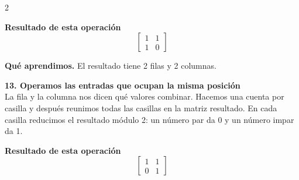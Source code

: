\documentclass[11pt,a4paper,landscape]{article}
\begin{document}
\begin{multicols*}{2}
\begin{minipage}{\linewidth}
\par{}\par\smallskip
\par\smallskip \textbf{Resultado de esta operación}\[\begin{bmatrix}1 & 1\\1 & 0\end{bmatrix}\]
\par\smallskip\textbf{Qué aprendimos.} El resultado tiene 2 filas y 2 columnas.
\end{minipage}\par\medskip
\noindent\begin{minipage}{\linewidth}\textbf{13. Operamos las entradas que ocupan la misma posición}\\[2pt]La fila y la columna nos dicen qué valores combinar. Hacemos una cuenta por casilla y después reunimos todas las casillas en la matriz resultado. En cada casilla reducimos el resultado módulo 2: un número par da 0 y un número impar da 1.
\par{}\par\smallskip
\par\smallskip \textbf{Resultado de esta operación}\[\begin{bmatrix}1 & 1\\0 & 1\end{bmatrix}\]

\end{minipage}
\end{multicols*}
\end{document}

